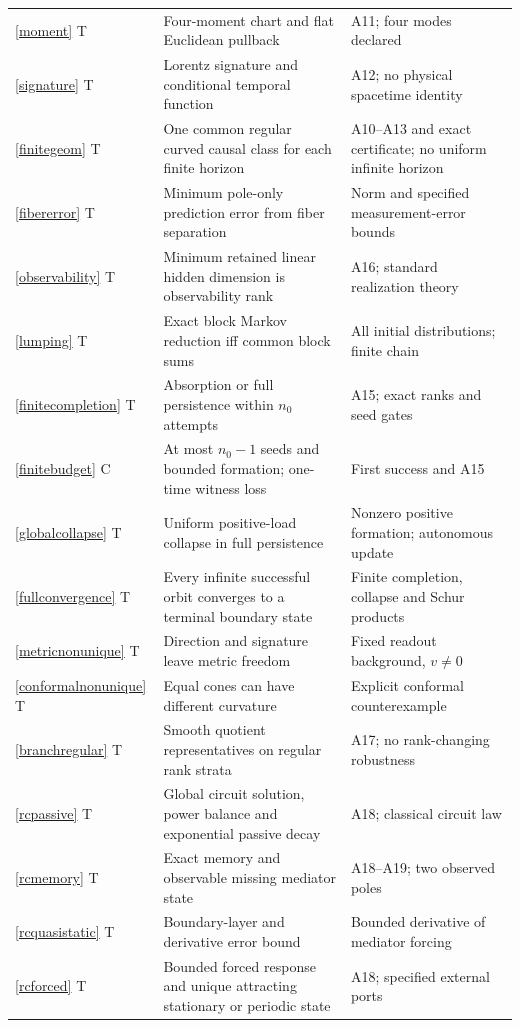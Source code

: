 \documentclass[11pt,letterpaper]{article}
\theoremstyle{definition}
\numberwithin{equation}{section}
\begin{document}
\begin{longtable}{p{}p{}p{}}
\ref{moment} T & Four-moment chart and flat Euclidean pullback & A11; four modes declared\\
\ref{signature} T & Lorentz signature and conditional temporal function & A12; no physical spacetime identity\\
\ref{finitegeom} T & One common regular curved causal class for each finite horizon & A10--A13 and exact certificate; no uniform infinite horizon\\
\ref{fibererror} T & Minimum pole-only prediction error from fiber separation & Norm and specified measurement-error bounds\\
\ref{observability} T & Minimum retained linear hidden dimension is observability rank & A16; standard realization theory\\
\ref{lumping} T & Exact block Markov reduction iff common block sums & All initial distributions; finite chain\\
\ref{finitecompletion} T & Absorption or full persistence within $n_0$ attempts & A15; exact ranks and seed gates\\
\ref{finitebudget} C & At most $n_0-1$ seeds and bounded formation; one-time witness loss & First success and A15\\
\ref{globalcollapse} T & Uniform positive-load collapse in full persistence & Nonzero positive formation; autonomous update\\
\ref{fullconvergence} T & Every infinite successful orbit converges to a terminal boundary state & Finite completion, collapse and Schur products\\
\ref{metricnonunique} T & Direction and signature leave metric freedom & Fixed readout background, $v\ne0$\\
\ref{conformalnonunique} T & Equal cones can have different curvature & Explicit conformal counterexample\\
\ref{branchregular} T & Smooth quotient representatives on regular rank strata & A17; no rank-changing robustness\\
\ref{rcpassive} T & Global circuit solution, power balance and exponential passive decay & A18; classical circuit law\\
\ref{rcmemory} T & Exact memory and observable missing mediator state & A18--A19; two observed poles\\
\ref{rcquasistatic} T & Boundary-layer and derivative error bound & Bounded derivative of mediator forcing\\
\ref{rcforced} T & Bounded forced response and unique attracting stationary or periodic state & A18; specified external ports\\

\end{longtable}
\end{document}
